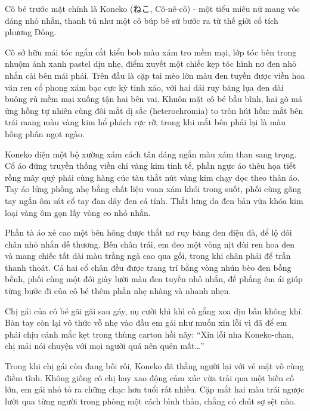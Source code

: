 ﻿\documentclass[../main.tex]{subfiles}
\begin{document}
\chrint

Cô bé trước mặt chính là Koneko (ねこ, Cô-nê-cô) - một tiểu miêu nữ mang vóc dáng nhỏ nhắn, thanh tú như một cô búp bê sứ bước ra từ thế giới cổ tích phương Đông.

Cô sở hữu mái tóc ngắn cắt kiểu bob màu xám tro mềm mại, lớp tóc bên trong nhuộm ánh xanh pastel dịu nhẹ, điểm xuyết một chiếc kẹp tóc hình nơ đen nhỏ nhắn cài bên mái phải. Trên đầu là cặp tai mèo lớn màu đen tuyền được viền hoa văn ren cổ phong xám bạc cực kỳ tinh xảo, với hai dải ruy băng lụa đen dài buông rủ mềm mại xuống tận hai bên vai. Khuôn mặt cô bé bầu bĩnh, hai gò má ửng hồng tự nhiên cùng đôi mắt dị sắc (heterochromia) to tròn hút hồn: mắt bên trái mang màu vàng kim hổ phách rực rỡ, trong khi mắt bên phải lại là màu hồng phấn ngọt ngào.


Koneko diện một bộ xường xám cách tân dáng ngắn màu xám than sang trọng. Cổ áo đứng truyền thống viền chỉ vàng kim tinh tế, phần ngực áo thêu họa tiết rồng mây quý phái cùng hàng cúc tàu thắt nút vàng kim chạy dọc theo thân áo. Tay áo lửng phồng nhẹ bằng chất liệu voan xám khói trong suốt, phối cùng găng tay ngắn ôm sát cổ tay đan dây đen cá tính. Thắt lưng da đen bản vừa khóa kim loại vàng ôm gọn lấy vòng eo nhỏ nhắn.

Phần tà áo xẻ cao một bên hông được thắt nơ ruy băng đen điệu đà, để lộ đôi chân nhỏ nhắn dễ thương. Bên chân trái, em đeo một vòng nịt đùi ren hoa đen và mang chiếc tất dài màu trắng ngà cao qua gối, trong khi chân phải để trần thanh thoát. Cả hai cổ chân đều được trang trí bằng vòng nhún bèo đen bồng bềnh, phối cùng một đôi giày lười màu đen tuyền nhỏ nhắn, đế phẳng êm ái giúp từng bước đi của cô bé thêm phần nhẹ nhàng và nhanh nhẹn.

\chrint

Chị gái của cô bé gãi gãi sau gáy, nụ cười khì khì cố gắng xoa dịu bầu không khí. Bàn tay còn lại vô thức vỗ nhẹ vào đầu em gái như muốn xin lỗi vì đã để em phải chịu cảnh mắc kẹt trong thùng carton hồi nãy: ``Xin lỗi nha Koneko-chan, chị mải nói chuyện với mọi người quá nên quên mất\dots''

Trong khi chị gái còn đang bối rối, Koneko đã thẳng người lại với vẻ mặt vô cùng điềm tĩnh. Không giống cô chị hay xao động cảm xúc vừa trải qua một biến cố lớn, em gái nhỏ tỏ ra chững chạc hơn tuổi rất nhiều. Cặp mắt hai màu trái ngược lướt qua từng người trong phòng một cách bình thản, chẳng có chút sợ sệt nào.
\end{document}
